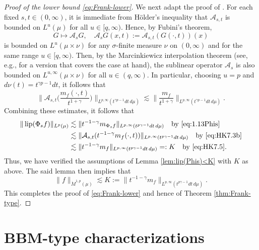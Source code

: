 \documentclass[11pt]{amsart}
\theoremstyle{definition}
\theoremstyle{remark}
\numberwithin{equation}{section}
\newcommand{\Norm}[2]{\|#1\|_{#2}}
\newcommand{\BNorm}[2]{\Big\|#1\Big\|_{#2}}
\begin{document}
\begin{proof}[Proof of the lower bound \eqref{eq:Frank-lower}]
We next adapt the proof of \cite[Lemma 7.5]{HK:W1p}. For each fixed $s,t\in(0,\infty)$, it
is immediate from H\"older's inequality that $\mathcal A_{s,t}$ is bounded on $L^u(\mu)$ for
all $u\in[q,\infty)$. Hence, by Fubini's theorem,
\begin{equation*}
  G\mapsto \mathcal A_s G,\quad
  \mathcal A_s G(x,t):=\mathcal A_{s,t}(G(\cdot,t))(x)
\end{equation*}
is bounded on $L^u(\mu\times\nu)$ for any $\sigma$-finite measure $\nu$ on $(0,\infty)$ and
for the same range $u\in[q,\infty)$. Then, by the Marcinkiewicz interpolation theorem (see,
e.g., \cite[Theorem 2.2.3]{HNVW1} for a version that covers the case at hand), the sublinear
operator $\mathcal A_s$ is also bounded  on $L^{u,\infty}(\mu\times\nu)$ for all
$u\in(q,\infty)$. In particular, choosing $u=p$ and $d\nu(t)=t^{\gamma p-1}dt$, it follows
that
\begin{equation}\label{eq:HK7.5}
  \BNorm{\mathcal A_{s,t}\Big(\frac{m_f(\cdot,t)}{t^{1+\gamma}}\Big)}{L^{p,\infty}(t^{\gamma
  p-1}dt\,d\mu)}
  \lesssim\BNorm{\frac{m_f}{t^{1+\gamma}}}{L^{p,\infty}(t^{\gamma p-1}dt\,d\mu)}.
\end{equation}
Combining these estimates, it follows that
\begin{equation}
\begin{split}
  \Norm{\operatorname{lip}(\Phi_s f)}{L^p(\mu)}
  &\lesssim\Norm{t^{-1-\gamma}m_{\Phi_s f}}{L^{p,\infty}(t^{p\gamma-1}dt\,d\mu)}
  \quad\text{by \eqref{eq:1.13Phis}} \\
  &\lesssim\Norm{\mathcal A_{s,t}(t^{-1-\gamma}m_f(\cdot,t))
  }{L^{p,\infty}(t^{p\gamma-1}dt\,d\mu)}
  \quad\text{by \eqref{eq:HK7.3b}} \\
  &\lesssim\Norm{t^{-1-\gamma}m_f}{L^{p,\infty}(t^{p\gamma-1}dt\,d\mu)}=:K
  \quad\text{by \eqref{eq:HK7.5}}.
\end{split}
\end{equation}
Thus, we have verified the assumptions of Lemma \ref{lem:lip(Phis)<K} with $K$ as above. The
said lemma then implies that
\begin{equation*}
  \Norm{f}{\dot M^{1,p}(\mu)}
  \lesssim K:=\Norm{t^{-1-\gamma}m_f}{L^{p,\infty}(t^{p\gamma-1}dt\,d\mu)}.
\end{equation*}
This completes the proof of \eqref{eq:Frank-lower} and hence of Theorem
\ref{thm:Frank-type}.
\end{proof}

\section{BBM-type characterizations}\label{sec:DMS}
\end{document}
